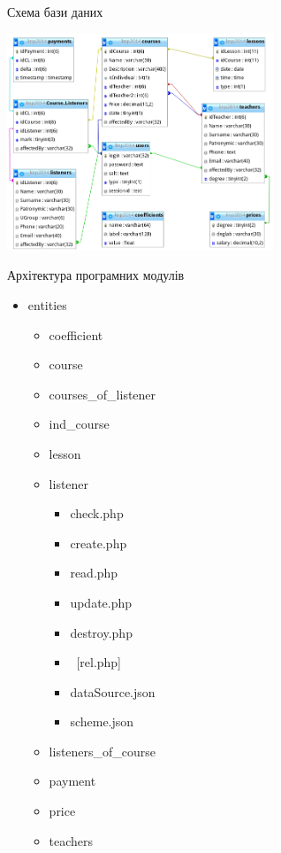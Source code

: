 \documentclass{beamer}
\begin{document}
\begin{frame}{\fn Схема бази даних}
\begin{center}
\includegraphics[width=8cm]{scrns/db.png}
\end{center}
\end{frame}
\begin{frame}{\fn Архітектура програмних модулів}
\begin{itemize}
\item entities
 \begin{itemize}
 \item coefficient
 \item course
 \item courses\_of\_listener
 \item ind\_course
 \item lesson
 \item listener
  \begin{itemize}
  \item check.php
  \item create.php
  \item read.php
  \item update.php
  \item destroy.php
  \item \ [rel.php]
  \item dataSource.json
  \item scheme.json
  \end{itemize}
 \item listeners\_of\_course
 \item payment
 \item price
 \item teachers
 \end{itemize}
\end{itemize}
\end{frame}
\end{document}
